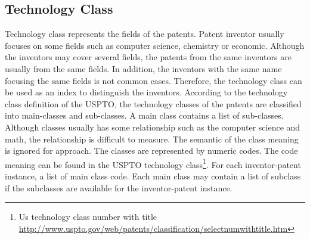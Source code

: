 \subsection{Technology Class}
Technology class represents the fields of the patents. Patent inventor usually focuses on some fields such as computer science, chemistry or economic. Although the inventors may cover several fields, the patents from the same inventors are usually from the same fields. In addition, the inventors with the same name focusing the same fields is not common cases. Therefore, the technology class can be used as an index to distinguish the inventors. According to the technology class definition of the USPTO, the technology classes of the patents are classified into main-classes and sub-classes. A main class contains a list of sub-classes. Although classes usually has some relationship such as the computer science and math, the relationship is difficult to measure. The semantic of the class meaning is ignored for approach. The classes are represented by numeric codes. The code meaning can be found in the USPTO technology class\footnote{Us technology class number with title \url{http://www.uspto.gov/web/patents/classification/selectnumwithtitle.htm}}.
For each inventor-patent instance, a list of main class code. Each main class may contain a list of subclass if the subclasses are available for the inventor-patent instance.


